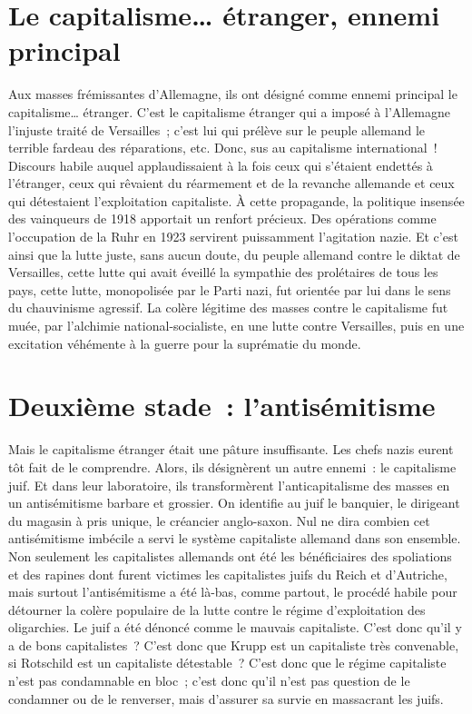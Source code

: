 \documentclass[french,twoside]{book} %
\begin{document}
\section[{Le capitalisme… étranger, ennemi principal}]{Le capitalisme… étranger, ennemi principal}
\noindent Aux masses frémissantes d’Allemagne, ils ont désigné comme ennemi principal le capitalisme… étranger. C’est le capitalisme étranger qui a imposé à l’Allemagne l’injuste traité de Versailles ; c’est lui qui prélève sur le peuple allemand le terrible fardeau des réparations, etc. Donc, sus au capitalisme international ! Discours habile auquel applaudissaient à la fois ceux qui s’étaient endettés à l’étranger, ceux qui rêvaient du réarmement et de la revanche allemande et ceux qui détestaient l’exploitation capitaliste. À cette propagande, la politique insensée des vainqueurs de 1918 apportait un renfort précieux. Des opérations comme l’occupation de la Ruhr en 1923 servirent puissamment l’agitation nazie. Et c’est ainsi que la lutte juste, sans aucun doute, du peuple allemand contre le diktat de Versailles, cette lutte qui avait éveillé la sympathie des prolétaires de tous les pays, cette lutte, monopolisée par le Parti nazi, fut orientée par lui dans le sens du chauvinisme agressif. La colère légitime des masses contre le capitalisme fut muée, par l’alchimie national-socialiste, en une lutte contre Versailles, puis en une excitation véhémente à la guerre pour la suprématie du monde.
\section[{Deuxième stade : l’antisémitisme}]{Deuxième stade : l’antisémitisme}
\noindent Mais le capitalisme étranger était une pâture insuffisante. Les chefs nazis eurent tôt fait de le comprendre. Alors, ils désignèrent un autre ennemi : le capitalisme juif. Et dans leur laboratoire, ils transformèrent l’anticapitalisme des masses en un antisémitisme barbare et grossier. On identifie au juif le banquier, le dirigeant du magasin à pris unique, le créancier anglo-saxon. Nul ne dira combien cet antisémitisme imbécile a servi le système capitaliste allemand dans son ensemble. Non seulement les capitalistes allemands ont été les bénéficiaires des spoliations et des rapines dont furent victimes les capitalistes juifs du Reich et d’Autriche, mais surtout l’antisémitisme a été là-bas, comme partout, le procédé habile pour détourner la colère populaire de la lutte contre le régime d’exploitation des oligarchies. Le juif a été dénoncé comme le mauvais capitaliste. C’est donc qu’il y a de bons capitalistes ? C’est donc que Krupp est un capitaliste très convenable, si Rotschild est un capitaliste détestable ? C’est donc que le régime capitaliste n’est pas condamnable en bloc ; c’est donc qu’il n’est pas question de le condamner ou de le renverser, mais d’assurer sa survie en massacrant les juifs.
\end{document}

